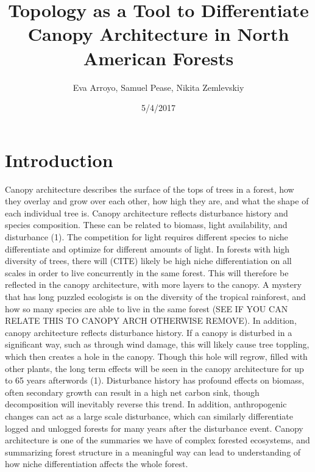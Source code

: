 \documentclass[10pt]{article}
\title{ Topology as a Tool to Differentiate Canopy Architecture in North American Forests }
\author{ Eva Arroyo, Samuel Pease, Nikita Zemlevskiy}
\date{5/4/2017}
\begin{document}
\maketitle
\newpage
\section*{Introduction}

\indent Canopy architecture describes the surface of the tops of trees in a forest, how they overlay and grow over each other, how high they are, and what the shape of each individual tree is. Canopy architecture reflects disturbance history and species composition. These can be related to biomass, light availability, and disturbance (1).  The competition for light requires different species to niche differentiate and optimize for different amounts of light. In forests with high diversity of trees, there will (CITE) likely be high niche differentiation on all scales in order to live concurrently in the same forest. This will therefore be reflected in the canopy architecture, with more layers to the canopy. A mystery that has long puzzled ecologists is on the diversity of the tropical rainforest, and how so many species are able to live in the same forest (SEE IF YOU CAN RELATE THIS TO CANOPY ARCH OTHERWISE REMOVE). In addition, canopy architecture reflects disturbance history. If a canopy is disturbed in a significant way, such as through wind damage, this will likely cause tree toppling, which then creates a hole in the canopy. Though this hole will regrow, filled with other plants, the long term effects will be seen in the canopy architecture for up to 65 years afterwords (1). Disturbance history has profound effects on biomass, often secondary growth can result in a high net carbon sink, though decomposition will inevitably reverse this trend. In addition, anthropogenic changes can act as a large scale disturbance, which can similarly differentiate logged and unlogged forests for many years after the disturbance event. Canopy architecture is one of the summaries we have of complex forested ecosystems, and summarizing forest structure in a meaningful way can lead to understanding of how niche differentiation affects the whole forest.
\end{document}
